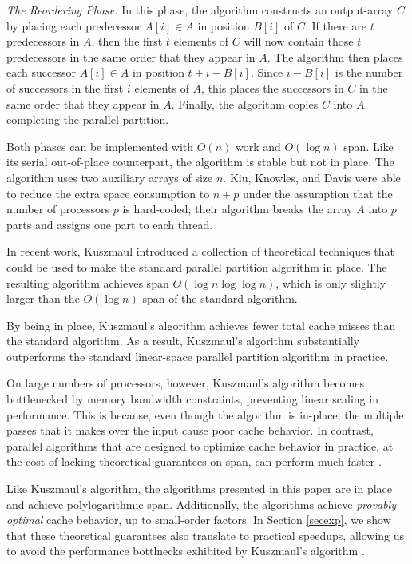 \documentclass[11pt]{article}
\renewcommand{\paragraph}[1]{\vspace{0.09in}\noindent{\bf \boldmath #1.}}
\theoremstyle{remark}
\theoremstyle{remark}
\begin{document}
\noindent\emph{The Reordering Phase: }In this phase, the algorithm
constructs an output-array $C$ by placing each predecessor $A[i] \in A$
in position $B[i]$ of $C$. If there are $t$ predecessors in $A$, then
the first $t$ elements of $C$ will now contain those $t$ predecessors
in the same order that they appear in $A$. The algorithm then places
each successor $A[i] \in A$ in position $t + i - B[i]$. Since $i - B[i]$
is the number of successors in the first $i$ elements of $A$, this
places the successors in $C$ in the same order that they appear in
$A$. Finally, the algorithm copies $C$ into $A$, completing the
parallel partition.

Both phases can be implemented with $O(n)$ work and $O(\log n)$
span. Like its serial out-of-place counterpart, the algorithm is
stable but not in place. The algorithm uses two auxiliary arrays of
size $n$. Kiu, Knowles, and Davis \cite{LiuKn05} were able to reduce
the extra space consumption to $n + p$ under the assumption that the
number of processors $p$ is hard-coded; their algorithm breaks the
array $A$ into $p$ parts and assigns one part to each thread. 

\paragraph{An In-Place Parallel Partition}
In recent work, Kuszmaul \cite{Kuszmaul19} introduced a collection
of theoretical techniques that could be used to make the standard
parallel partition algorithm in place. The resulting algorithm
achieves span $O(\log n \log \log n)$, which is only slightly larger
than the $O(\log n)$ span of the standard algorithm.

By being in place, Kuszmaul's algorithm achieves fewer total cache
misses than the standard algorithm. As a result, Kuszmaul's algorithm
substantially outperforms the standard linear-space parallel partition
algorithm in practice.

On large numbers of processors, however, Kuszmaul's algorithm becomes
bottlenecked by memory bandwidth constraints, preventing linear
scaling in performance. This is because, even though the algorithm is
in-place, the multiple passes that it makes over the input cause poor
cache behavior. In contrast, parallel algorithms that are designed to
optimize cache behavior in practice, at the cost of lacking
theoretical guarantees on span, can perform much faster
\cite{FrancisPa92, Frias08}.

Like Kuszmaul's algorithm, the algorithms presented in this paper are
in place and achieve polylogarithmic span. Additionally, the
algorithms achieve \emph{provably optimal} cache behavior, up to
small-order factors. In Section \ref{secexp}, we show that these
theoretical guarantees also translate to practical speedups, allowing
us to avoid the performance bottlnecks exhibited by Kuszmaul's
algorithm \cite{Kuszmaul19}.
\end{document}

